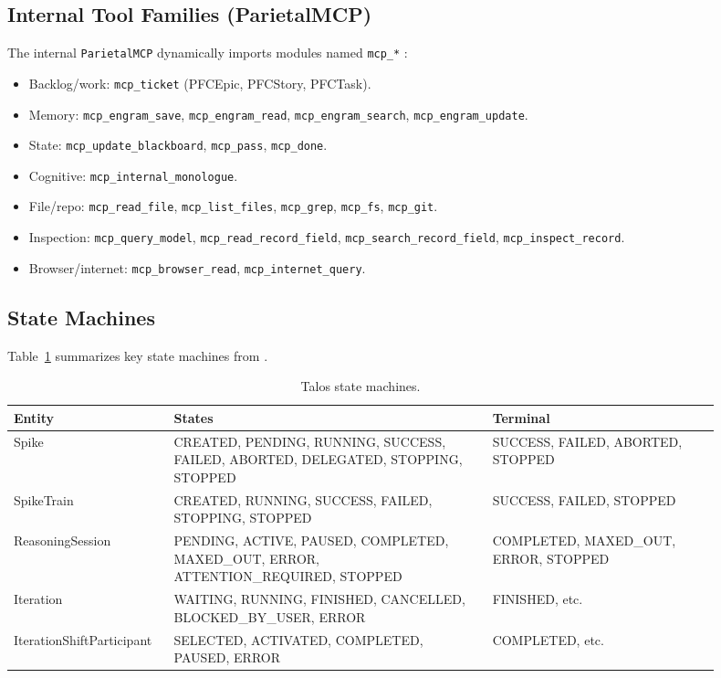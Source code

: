 \documentclass[11pt]{article}
\begin{document}
	\subsection{Internal Tool Families (ParietalMCP)}
	The internal \texttt{ParietalMCP} dynamically imports modules named \texttt{mcp\_*} \cite{talosLiveCodebase}:
	\begin{itemize}
		\item Backlog/work: \texttt{mcp\_ticket} (PFCEpic, PFCStory, PFCTask).
		\item Memory: \texttt{mcp\_engram\_save}, \texttt{mcp\_engram\_read}, \texttt{mcp\_engram\_search}, \texttt{mcp\_engram\_update}.
		\item State: \texttt{mcp\_update\_blackboard}, \texttt{mcp\_pass}, \texttt{mcp\_done}.
		\item Cognitive: \texttt{mcp\_internal\_monologue}.
		\item File/repo: \texttt{mcp\_read\_file}, \texttt{mcp\_list\_files}, \texttt{mcp\_grep}, \texttt{mcp\_fs}, \texttt{mcp\_git}.
		\item Inspection: \texttt{mcp\_query\_model}, \texttt{mcp\_read\_record\_field}, \texttt{mcp\_search\_record\_field}, \texttt{mcp\_inspect\_record}.
		\item Browser/internet: \texttt{mcp\_browser\_read}, \texttt{mcp\_internet\_query}.
	\end{itemize}

	\subsection{State Machines}
	Table~\ref{tab:state-machines} summarizes key state machines from \cite{talosCombined}.

	\begin{table}[ht]
		\centering
		\caption{Talos state machines.}
		\label{tab:state-machines}
		\small
		\begin{tabular}{@{}p{0.18\linewidth}p{0.42\linewidth}p{0.30\linewidth}@{}}
			\toprule
			\textbf{Entity} & \textbf{States} & \textbf{Terminal} \\
			\midrule
			Spike & CREATED, PENDING, RUNNING, SUCCESS, FAILED, ABORTED, DELEGATED, STOPPING, STOPPED & SUCCESS, FAILED, ABORTED, STOPPED \\
			SpikeTrain & CREATED, RUNNING, SUCCESS, FAILED, STOPPING, STOPPED & SUCCESS, FAILED, STOPPED \\
			ReasoningSession & PENDING, ACTIVE, PAUSED, COMPLETED, MAXED\_OUT, ERROR, ATTENTION\_REQUIRED, STOPPED & COMPLETED, MAXED\_OUT, ERROR, STOPPED \\
			Iteration & WAITING, RUNNING, FINISHED, CANCELLED, BLOCKED\_BY\_USER, ERROR & FINISHED, etc. \\
			IterationShiftParticipant & SELECTED, ACTIVATED, COMPLETED, PAUSED, ERROR & COMPLETED, etc. \\
			\bottomrule
		\end{tabular}
	\end{table}
\end{document}
